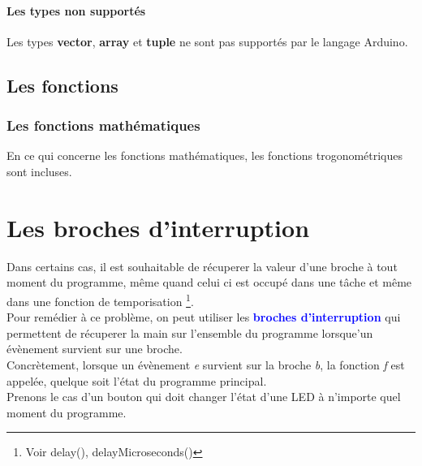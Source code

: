 \subsubsection{Les types non supportés}

Les types \textbf{vector}, \textbf{array} et \textbf{tuple} ne sont pas supportés par le langage Arduino.




\section{Les fonctions}

\subsection{Les fonctions mathématiques}

En ce qui concerne les fonctions mathématiques, les fonctions trogonométriques sont incluses.



\chapter{Les broches d'interruption}

Dans certains cas, il est souhaitable de récuperer la valeur d'une broche à tout moment du programme, même quand celui ci est occupé dans une tâche et même dans une fonction de temporisation \footnote{Voir delay(), delayMicroseconds()}. \\
Pour remédier à ce problème, on peut utiliser les \textcolor{blue} {\textbf{broches d'interruption}} qui permettent de récuperer la main sur l'ensemble du programme lorsque'un évènement survient sur une broche.\\

Concrètement, lorsque un évènement  \emph{e} survient sur la broche \emph{b}, la fonction \emph{f} est appelée, quelque soit l'état du programme principal. \\


Prenons le cas d'un bouton qui doit changer l'état d'une LED à n'importe quel moment du programme.


